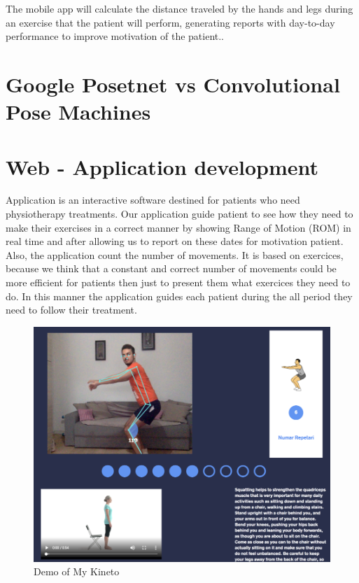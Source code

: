 The mobile app will calculate the distance traveled by the hands and legs during an exercise that the 
patient will perform, generating reports with day-to-day performance to improve motivation of the patient..







 \section{Google Posetnet vs Convolutional Pose Machines }

\section{Web - Application development}


Application is an interactive software destined for patients who need physiotherapy
treatments. Our application guide patient to see how they need to make their exercises in 
a correct manner by showing Range of Motion (ROM) in real time and after allowing us to 
report on these dates for motivation patient. 
Also, the application count the number of movements. 
It is based on exercices, because we think that a constant and correct number of movements could be more efficient for patients then just to present them what exercices they need to do. In this manner the application guides each patient during the all period they need to follow their treatment. 

\begin{figure}[htbp]
	\centerline{\includegraphics[scale=0.8]{fig/demo-mykineto.png}}  
	\caption{Demo of My Kineto}
\end{figure}
